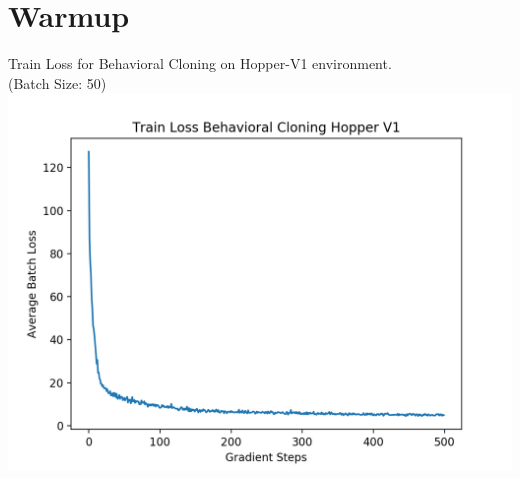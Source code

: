 \documentclass[12pt]{report}
\begin{document}
\section*{Warmup}
Train Loss for Behavioral Cloning on Hopper-V1 environment.
\\(Batch Size: 50)\\
\includegraphics[scale=.95]{./images/warmup_train_loss.png}
\end{document}
